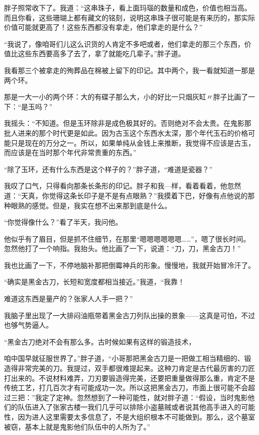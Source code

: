 胖子照常收下了。我道：“这串珠子，看上面玛瑙的数量和成色，价值也相当高。而且你看，这些珊瑚上都有藏文的铭刻，说明这串珠子很可能是有来历的，那实际价值可能就更高了！这些东西都没有拿走，他们拿走的是什么？”

“我说了，像咱哥们儿这么识货的人肯定不多吧或者，他们拿走的那三个东西，价值比这些东西要高多了去了，拿了就能吃几辈子。”胖子道。

我看那三个被拿走的殉葬品在棉被上留下的印记。其中两个，我一看就知道一那是两个环。

那是一大一小的两个环：大的有碟子那么大，小的好比一只烟灰缸〃胖子比画了一下：“是玉吗？”

我摇头：“不知道。但是玉环除非是成色极其好的。否则绝对不会太贵。在鬼影那批人进来的那个时代更是如此。因为古玉这个东西水太深，那个年代玉石的价格可能只是现在的万分之一。所以，如果单纯从金钱上来推断，我觉得不应该是古玉，而应该是在当时那个年代非常贵重的东西。”

“除了玉环，还有什么东西是这个样子的？”胖子道，“难道是瓷器？”

我叹了口气，只得看向那条长条形的印记。胖子和我—样，看着看着，他忽然道：“天真，你觉得这条长印子是不是有点眼熟？”我摸着下巴，好像有点他说的那种眼熟的感觉。但是，我实在想不出来那到底是什么。

“你觉得像什么？”看了半天，我问他。

他似乎有了眉目，但是抓不住细节，在那里“嗯嗯嗯嗯嗯嗯……”，嗯了很长时间。忽然他打了一个响指。我抬头。他比画了一下，说道：“刀，刀，黑金古刀！”

我也比画了一下，不停地脑补那把倒霉神兵的形象。慢慢地，我就开始冒冷汗了。

“确实是黑金古刀，长短和宽度都相当接近。”我道，“我靠！

难道这东西是量产的？张家人人手一把？”

我脑子里出现了一大排闷油瓶带着黑金古刀列队出操的景象——这真是可怕，不过也够气势逼人。

“黑金古刀绝对不会有那么多。古时候如果有这样的锻造技术，

咱中国早就征服世界了。”胖子道，“小哥那把黑金古刀是一把做工相当精细的、锻造得非常完美的刀。我提过，双手都很难提起来。这种刀肯定是古代最厉害的刀匠打出来的。不说材料难弄，刀刃要锻造得完美，还要把重量做得那么重，肯定不是传统工艺，打几百次才有可能成功一次。所以这把黑金古刀，市面上很可能不会超过三把：”我定了定神。忽然想到了一种可能性，就对胖子道：“假设，当时鬼影他们的队伍进入了张家古楼一我们几乎可以排除小盗墓贼或者说其他高手进入的可能性，因为进人这里需要太多信息了，不是大组织根本不可能做到。那么，这个墓室被窃，基本上就是鬼影他们队伍中的人所为了。”

